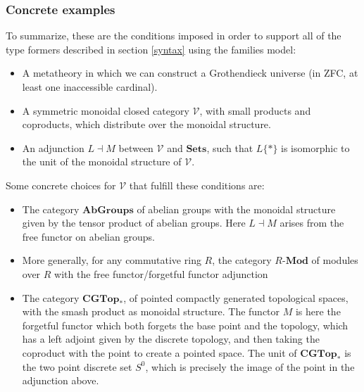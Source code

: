 \documentclass[a4paper,english]{lipics-v2018}
\begin{document}
\subsubsection{Concrete examples}
To summarize, these are the conditions imposed in order to support all of the type formers described in section \ref{syntax} using the families model:
\begin{itemize}
\item A metatheory in which we can construct a Grothendieck universe (in ZFC, at least one inaccessible cardinal).
\item A symmetric monoidal closed category $\mathcal{V}$, with small products and coproducts, which distribute over the monoidal structure.
\item An adjunction $L \dashv M$ between $\mathcal{V}$ and $\mathbf{Sets}$, such that $L\{*\}$ is isomorphic to the unit of the monoidal structure of $\mathcal{V}$.
\end{itemize}
Some concrete choices for $\mathcal{V}$ that fulfill these conditions are:
\begin{itemize}
\item The category $\mathbf{AbGroups}$ of abelian groups with the monoidal structure given by the tensor product of abelian groups. Here $L \dashv M$ arises from the free functor on abelian groups.
\item More generally, for any commutative ring $R$, the category $R$-$\mathbf{Mod}$ of modules over $R$ with the free functor/forgetful functor adjunction
\item The category $\mathbf{CGTop}_*$, of pointed compactly generated topological spaces, with the smash product as monoidal structure. The functor $M$ is here the forgetful functor which both forgets the base point and the topology, which has a left adjoint given by the discrete topology, and then taking the coproduct with the point to create a pointed space. The unit of $\mathbf{CGTop}_*$ is the two point discrete set $S^0$, which is precisely the image of the point in the adjunction above.
\end{itemize}
\end{document}
